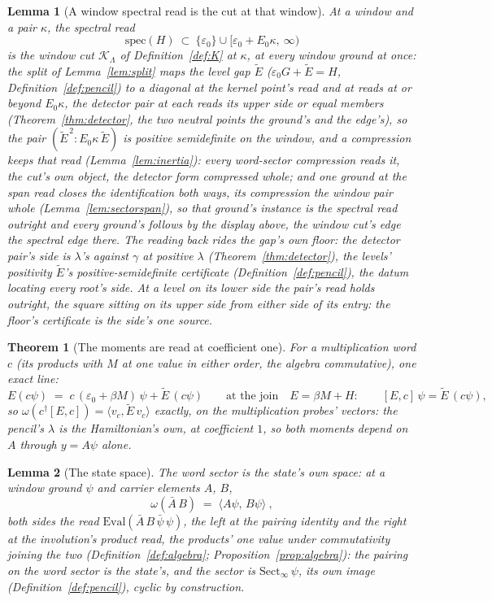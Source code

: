 \documentclass[11pt]{article}
\newtheorem{theorem}{Theorem}
\newtheorem{lemma}{Lemma}
\theoremstyle{definition}
\begin{document}
\begin{lemma}[A window spectral read is the cut at that window]
\label{lem:speccut}
At a window and a pair $\kappa$, the spectral read
\[
\mathrm{spec}(H)\ \subset\ \{\varepsilon_0\}\cup
[\varepsilon_0+E_0\kappa,\ \infty)
\]
is the window cut $\mathcal K_\Lambda$ of Definition~\ref{def:K} at
$\kappa$, at every window ground at once: the split of Lemma~\ref{lem:split}
maps the level gap $\tilde E$ ($\varepsilon_0G+\tilde E=H$,
Definition~\ref{def:pencil}) to a diagonal at the kernel point's read
and at reads at or beyond $E_0\kappa$, the detector pair at
each reads its upper side or equal members
(Theorem~\ref{thm:detector}, the two neutral points the ground's and
the edge's), so the pair
$(\tilde E^{\,2}:E_0\kappa\,\tilde E)$ is positive semidefinite on
the window, and a compression keeps that read
(Lemma~\ref{lem:inertia}): every word-sector compression reads it,
the cut's own object, the detector form compressed whole; and one
ground at the span read closes the identification both ways, its
compression the window pair whole (Lemma~\ref{lem:sectorspan}), so
that ground's instance is the spectral read outright and every
ground's follows by the display above, the window cut's edge the
spectral edge there. The reading back rides the gap's own
floor: the detector pair's side is $\lambda$'s against $\gamma$
at positive $\lambda$ (Theorem~\ref{thm:detector}), the levels'
positivity $\tilde E$'s positive-semidefinite certificate
(Definition~\ref{def:pencil}), the datum locating every root's
side. At a level on its lower side the pair's read holds outright,
the square sitting on its upper side from either side of its
entry: the floor's certificate is the side's one source.
\end{lemma}

\begin{theorem}[The moments are read at coefficient
one]\label{thm:coeffone}
For a \emph{multiplication} word $c$ (its products with $M$ at one
value in either order, the algebra commutative), one exact line:
\[
E(c\psi)\;=\;c\,(\varepsilon_0+\beta M)\,\psi+\tilde E\,(c\psi)
\qquad\text{at the join}\quad E=\beta M+H:\qquad
[E,c]\,\psi=\tilde E\,(c\psi) ,
\]
so
$\omega(c^\dagger[E,c])=\langle v_c,\tilde E\,v_c
\rangle$ \emph{exactly}, on the multiplication probes' vectors: the pencil's
$\lambda$ is the Hamiltonian's own, at coefficient $1$, so both moments depend
on $A$ through $y=A\psi$ alone.
\end{theorem}

\begin{lemma}[The state space]\label{lem:statespace}
The word sector is the state's own space: at a window ground
$\psi$ and carrier elements $A$, $B$,
\[
\omega(\bar A\,B)\;=\;\langle A\psi,\,B\psi\rangle\ ,
\]
both sides the read $\mathrm{Eval}(\bar A\,B\,\bar\psi\,\psi)$,
the left at the pairing identity and the right at the
involution's product read, the products' one value under
commutativity joining the two
(Definition~\ref{def:algebra}; Proposition~\ref{prop:algebra}):
the pairing on the word sector is the state's, and the sector is
$\mathrm{Sect}_\infty\,\psi$, its own image
(Definition~\ref{def:pencil}), cyclic by construction.
\end{lemma}
\end{document}
